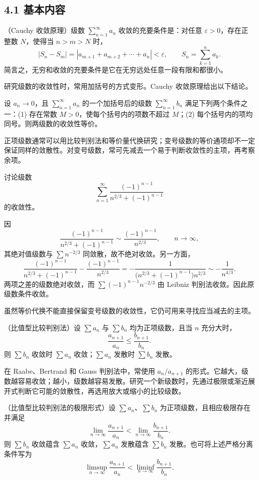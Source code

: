 \subsection*{4.1 基本内容}

（Cauchy 收敛原理）级数 $\sum_{n=1}^{\infty}a_n$ 收敛的充要条件是：对任意 $\varepsilon>0$，存在正整数 $N$，使得当 $n>m>N$ 时，
\[
|S_n-S_m|=|a_{m+1}+a_{m+2}+\cdots+a_n|<\varepsilon,
\qquad S_n=\sum_{k=1}^{n}a_k.
\]
简言之，无穷和收敛的充要条件是它在无穷远处任意一段有限和都很小。

研究级数的收敛性时，常用加括号的方式变形。Cauchy 收敛原理给出以下结论。

设 $a_n\to0$，且 $\sum_{n=1}^{\infty}a_n$ 的一个加括号后的级数 $\sum_{n=1}^{\infty}b_n$ 满足下列两个条件之一：\textup{(1)} 存在常数 $M>0$，使每个括号内的项数不超过 $M$；\textup{(2)} 每个括号内的项均同号。则两级数的收敛性等价。

正项级数通常可以用比较判别法和等价量代换研究；变号级数的等价通项却不一定保证同样的敛散性。对变号级数，常可先减去一个易于判断收敛性的主项，再考察余项。

讨论级数
\[
\sum_{n=1}^{\infty}\frac{(-1)^{n-1}}{n^{2/3}+(-1)^{n-1}}
\]
的收敛性。

\sol 因
\[
\frac{(-1)^{n-1}}{n^{2/3}+(-1)^{n-1}}
\sim\frac{(-1)^{n-1}}{n^{2/3}},
\qquad n\to\infty,
\]
其绝对值级数与 $\sum n^{-2/3}$ 同敛散，故不绝对收敛。另一方面，
\[
\frac{(-1)^{n-1}}{n^{2/3}+(-1)^{n-1}}
-\frac{(-1)^{n-1}}{n^{2/3}}
=-\frac1{\bigl(n^{2/3}+(-1)^{n-1}\bigr)n^{2/3}}
\sim-\frac1{n^{4/3}}.
\]
两项之差的级数绝对收敛，而 $\sum(-1)^{n-1}n^{-2/3}$ 由 Leibniz 判别法收敛。因此原级数条件收敛。

虽然等价代换不能直接保留变号级数的收敛性，它仍可用来寻找应当减去的主项。

（比值型比较判别法）设 $\sum a_n$ 与 $\sum b_n$ 均为正项级数，且当 $n$ 充分大时，
\[
\frac{a_{n+1}}{a_n}\leq\frac{b_{n+1}}{b_n}.
\]
则 $\sum b_n$ 收敛时 $\sum a_n$ 收敛；$\sum a_n$ 发散时 $\sum b_n$ 发散。

在 Raabe、Bertrand 和 Gauss 判别法中，常使用 $a_n/a_{n+1}$ 的形式。它越大，级数越容易收敛；越小，级数越容易发散。研究一个新级数时，先通过极限或渐近展开式判断它可能的敛散性，再选用放大或缩小的比较级数。

（比值型比较判别法的极限形式）设 $\sum a_n$、$\sum b_n$ 为正项级数，且相应极限存在并满足
\[
\lim_{n\to\infty}\frac{a_{n+1}}{a_n}
<\lim_{n\to\infty}\frac{b_{n+1}}{b_n}.
\]
则 $\sum b_n$ 收敛蕴含 $\sum a_n$ 收敛，$\sum a_n$ 发散蕴含 $\sum b_n$ 发散。也可将上述严格分离条件写为
\[
\limsup_{n\to\infty}\frac{a_{n+1}}{a_n}
<\liminf_{n\to\infty}\frac{b_{n+1}}{b_n}.
\]

